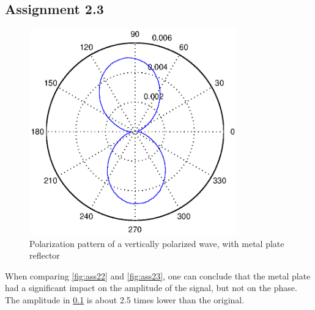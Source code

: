 \documentclass{article}
\begin{document}
\subsection{Assignment 2.3}\label{ass23}
\begin{figure}[H]
\centering
\includegraphics[width=0.8\textwidth]{Plotjes/ass23.eps}
\caption{Polarization pattern of a vertically polarized wave, with metal plate reflector}\label{fig:ass23}
\end{figure}
When comparing \autoref{fig:ass22} and \autoref{fig:ass23}, one can conclude that the metal plate had a significant impact on the amplitude of the signal, but not on the phase. The amplitude in \ref{ass23} is about 2.5 times lower than the original. 
\end{document}
